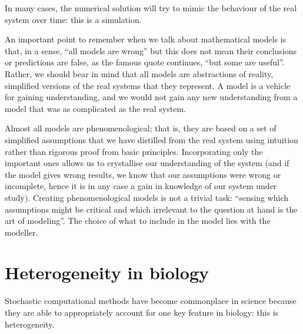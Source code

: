 \documentclass[12pt,a4paper]{report}
\begin{document}
In many cases, the numerical solution will try to mimic the behaviour of the real system over time: this is a simulation.

An important point to remember when we talk about mathematical models is that, in a sense, ``all models are wrong''  but this does not mean their conclusions or predictions are false, as the famous quote continues, ``but some are useful''. Rather, we should bear in mind that all models are abstractions of reality, simplified versions of the real systems that they represent. A model is a vehicle for gaining understanding, and we would not gain any new understanding from a model that was as complicated as the real system. 

Almost all models are phenomenological; that is, they are based on a set of simplified assumptions that we have distilled from the real system using intuition rather than rigorous proof from basic principles. Incorporating only the important ones allows us to crystallise our understanding of the system (and if the model gives wrong results, we know that our assumptions were wrong or incomplete, hence it is in any case a gain in knowledge of our system under study). Creating phenomenological models is not a trivial task: ``sensing which assumptions might be critical and which irrelevant to the question at hand is the art of modeling''. The choice of what to include in the model lies with the modeller.





\section{Heterogeneity in biology}
Stochastic computational methods have become commonplace in science because they are able to appropriately account for one key feature in biology: this is heterogeneity.
\end{document}
